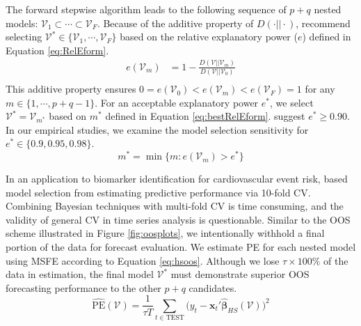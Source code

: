 The forward stepwise algorithm leads to the following sequence of $p+q$ nested models: $\mathcal{V}_1 \subset \cdots \subset \mathcal{V}_F$. Because of the additive property of $D(\cdot||\cdot)$, \cite{Dupuis2003} recommend selecting $\mathcal{V}^* \in \{\mathcal{V}_1,\cdots,\mathcal{V}_F\}$ based on the relative explanatory power ($e$) defined in Equation \ref{eq:RelEform}. 
\begin{equation}
\label{eq:RelEform}
\begin{split}
e(\mathcal{V}_{m})&=1-\frac{D(\mathcal{V}||\mathcal{V}_m)}{D(\mathcal{V}||\mathcal{V}_0)}\\
\end{split}
\end{equation}
This additive property ensures $0=e(\mathcal{V}_{0}) < e(\mathcal{V}_{m})< e(\mathcal{V}_{F})=1$ for any $m\in\{1,\cdots,p+q-1\}$. For an acceptable explanatory power $e^*$, we select $\mathcal{V}^*=\mathcal{V}_{m^*}$ based on $m^*$ defined in Equation \ref{eq:bestRelEform}. \cite{Piironen2015} suggest $e^*\geq 0.90$.  In our empirical studies, we examine the model selection sensitivity for $e^*\in\{0.9,0.95,0.98\}$.
\begin{equation}
\label{eq:bestRelEform}
m^*=\min \{m: e(\mathcal{V}_{m})>e^*\}
\end{equation}

In an application to biomarker identification for cardiovascular event risk, \cite{Peltola2014} based model selection from estimating predictive performance via 10-fold CV. Combining Bayesian techniques with multi-fold CV is time consuming, and the validity of general CV in time series analysis is questionable. Similar to the OOS scheme illustrated in Figure \ref{fig:oosplots}, we intentionally withhold a final portion of the data for forecast evaluation. We estimate PE for each nested model using MSFE according to Equation \ref{eq:hsoos}. Although we lose  $\tau\times 100\%$ of the data in estimation, the final model $\mathcal{V}^*$ must demonstrate superior OOS forecasting performance to the other $p+q$ candidates.
\begin{equation}
\label{eq:hsoos}
	\widehat{\textrm{PE}}(\mathcal{V})=\frac{1}{\tau T}\sum\limits_{t\in \textrm{TEST}} \bigg(y_t-\bm{x}_t'\hat{\bm{\beta}}_{HS}(\mathcal{V})\bigg)^2
\end{equation}











